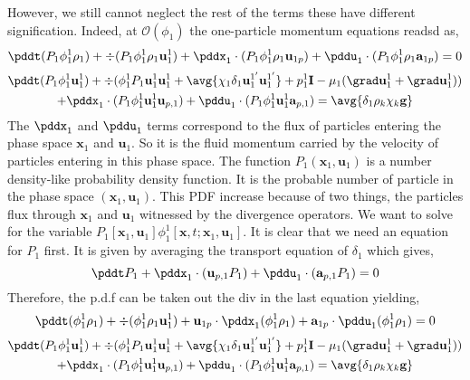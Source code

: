 However, we still cannot neglect the rest of the terms these have different signification. 
Indeed, at $\mathcal{O}(\phi_1)$ the one-particle momentum equations readsd as, 
\begin{equation}
    \pddt (P_1\phi_1^1\rho_1)
    +  \div (P_1\phi_1^1\rho_1\textbf{u}_1^1)
    +  \pddx_1 \cdot
    (P_1\phi_1^1\rho_1 \textbf{u}_{1p})
    +  \pddu_1 \cdot
    (P_1\phi_1^1\rho_1 \textbf{a}_{1p})
    = 0
\end{equation}
\begin{multline}
    \pddt(P_1\phi_1^1 \textbf{u}_1^1)
    + \div(
        \phi_1^1 P_1 \textbf{u}_1^1\textbf{u}_1^1
        +\avg{\chi_1 \delta_1 \textbf{u}_1^{1'}\textbf{u}_1^{1'}}
        + p_1^1 \textbf{I}
        -\mu_1  (\grad \textbf{u}_1^1+\grad \textbf{u}_1^1)
    )\\
    + \pddx_1 \cdot
        (P_1\phi_1^1 \textbf{u}_1^1 \textbf{u}_{p,1})
    + \pddu_1 \cdot
        (P_1\phi_1^1 \textbf{u}_1^1 \textbf{a}_{p,1})
    = \avg{\delta_1 \rho_k \chi_k \textbf{g} }
\end{multline}
The $\pddx_1$ and $\pddu_1$ terms correspond to the flux of particles entering the phase space $\textbf{x}_1$ and $\textbf{u}_1$. 
So it is the fluid momentum carried by the velocity of particles entering in this phase space. 
The function $P_1(\textbf{x}_1,\textbf{u}_1)$ is a number density-like probability density function. 
It is the probable number of particle in the phase space $(\textbf{x}_1,\textbf{u}_1)$. 
This PDF increase because of two things, the particles flux through $\textbf{x}_1$ and $\textbf{u}_1$ witnessed by the divergence operators. 
We want to solve for the variable $P_1[\textbf{x}_1,\textbf{u}_1]\phi_1^1[\textbf{x},t;\textbf{x}_1,\textbf{u}_1]$. 
It is clear that we need an equation for $P_1$ first. 
It is given by averaging the transport equation of $\delta_1$ which gives, 
\begin{equation*}
    \pddt P_1
    + 
     \pddx_1\cdot(\textbf{u}_{p,1}  P_1)
    +\pddu_1\cdot(\textbf{a}_{p,1}  P_1)
    = 0 
\end{equation*}
Therefore, the p.d.f can be taken out the div in the last equation yielding, 
\begin{equation}
    \pddt (\phi_1^1\rho_1)
    +    \div (\phi_1^1\rho_1\textbf{u}_1^1)
    +   \textbf{u}_{1p} \cdot \pddx_1  (\phi_1^1\rho_1 )
    +   \textbf{a}_{1p} \cdot \pddu_1  (\phi_1^1\rho_1 )
    = 0
\end{equation}
\begin{multline}
    \pddt(P_1\phi_1^1 \textbf{u}_1^1)
    + \div(
        \phi_1^1 P_1 \textbf{u}_1^1\textbf{u}_1^1
        +\avg{\chi_1 \delta_1 \textbf{u}_1^{1'}\textbf{u}_1^{1'}}
        + p_1^1 \textbf{I}
        -\mu_1  (\grad \textbf{u}_1^1+\grad \textbf{u}_1^1)
    )\\
    + \pddx_1 \cdot
        (P_1\phi_1^1 \textbf{u}_1^1 \textbf{u}_{p,1})
    + \pddu_1 \cdot
        (P_1\phi_1^1 \textbf{u}_1^1 \textbf{a}_{p,1})
    = \avg{\delta_1 \rho_k \chi_k \textbf{g} }
\end{multline}
